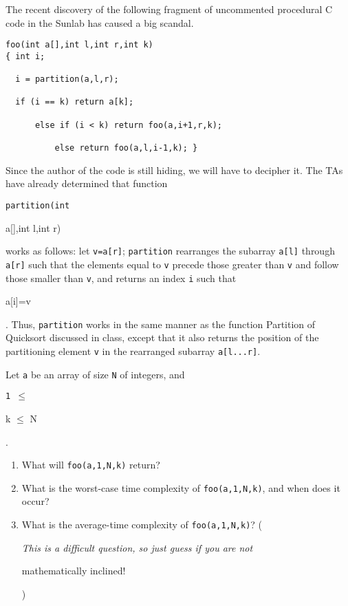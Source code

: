 The recent discovery of the following fragment of uncommented
procedural C code in the Sunlab has caused a big scandal.

\begin{verbatim}
foo(int a[],int l,int r,int k)
{ int i;

  i = partition(a,l,r);

  if (i == k) return a[k];

      else if (i < k) return foo(a,i+1,r,k);

          else return foo(a,l,i-1,k); }

\end{verbatim}

Since the author of the code is still hiding, we will have to decipher
it.  The TAs have already determined that function {\tt partition(int

a[],int l,int r)} works as follows: let {\tt v=a[r]}; {\tt partition}
rearranges the subarray {\tt a[l]} through {\tt a[r]} such that the
elements equal to {\tt v} precede those greater than {\tt v} and follow
those smaller than {\tt v}, and returns an index {\tt i} such that {\tt

a[i]=v}.   Thus, {\tt partition} works in the same manner as the
function Partition of Quicksort discussed in class, except that it also
returns the position of the partitioning element {\tt v} in the
rearranged subarray {\tt a[l...r]}.

Let {\tt a} be an array of size {\tt N} of integers, and {\tt 1 $\leq$

k $\leq$ N}.

\begin{enumerate}

\item  What will {\tt foo(a,1,N,k)} return?

\item  What is the worst-case time complexity of {\tt foo(a,1,N,k)}, and
when does it occur? 

\item  What is the average-time complexity of {\tt foo(a,1,N,k)}?
({\em This is a difficult question, so just guess if you are not

mathematically inclined!})

\end{enumerate}

